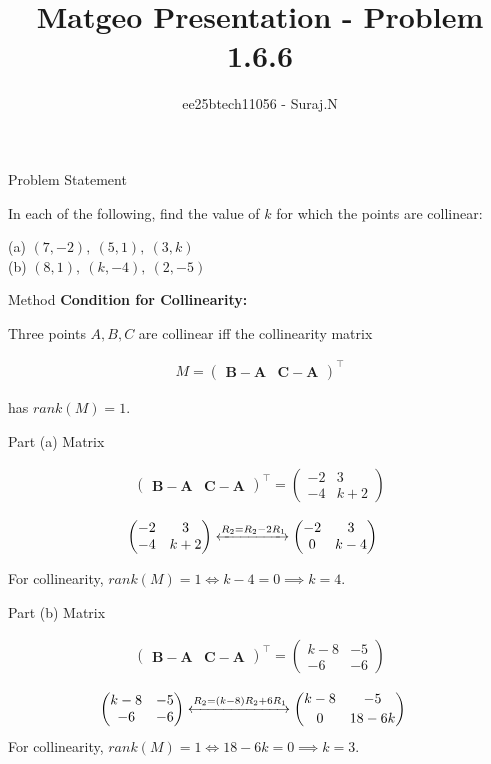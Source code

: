 \documentclass{beamer}
\title{Matgeo Presentation - Problem 1.6.6}
\author{ee25btech11056 - Suraj.N}
\numberwithin{equation}{section}
\providecommand{\brak}[1]{\ensuremath{\left(#1\right)}}
\theoremstyle{remark}
\newcommand{\myvec}[1]{\ensuremath{\begin{pmatrix}#1\end{pmatrix}}}
\let\vec\mathbf
\begin{document}
\begin{frame}
  \titlepage
\end{frame}

\begin{frame}{Problem Statement}

 In each of the following, find the value of $k$ for which the points are collinear:
  
    (a) $(7,-2),\ (5,1),\ (3,k)$ \\
    (b) $(8,1),\ (k,-4),\ (2,-5)$
  

\end{frame}

\begin{frame}{Method}
\textbf{Condition for Collinearity:}

Three points $A, B, C$ are collinear iff the collinearity matrix

\begin{align*}
M=\myvec{ \vec{B}-\vec{A} & \vec{C}-\vec{A} }^\top
\end{align*}

has $rank\brak{M}=1$.

\end{frame}

\begin{frame}{Part (a) Matrix}

\begin{align*}
\myvec{ \vec{B}-\vec{A} & \vec{C}-\vec{A} }^\top = \myvec{-2 & 3\\ -4 & k+2}
\end{align*}

\begin{align*}
\myvec{-2 & 3\\ -4 & k+2}
&\xleftrightarrow{R_2 = R_2 - 2R_1}
\myvec{-2 & 3\\ 0 & k-4}
\end{align*}

For collinearity, $rank\brak{M}=1 \iff k-4=0 \implies \boxed{k=4}$.

\end{frame}

\begin{frame}{Part (b) Matrix}

\begin{align*}
\myvec{ \vec{B}-\vec{A} & \vec{C}-\vec{A} }^\top = \myvec{k-8 & -5\\ -6 & -6}
\end{align*}

\begin{align*}
\myvec{k-8 & -5\\ -6 & -6}
&\xleftrightarrow{R_2 = (k-8)R_2 + 6R_1}
\myvec{k-8 & -5\\[2pt] 0 & 18-6k}
\end{align*}
For collinearity, $rank\brak{M}=1 \iff 18-6k=0 \implies \boxed{k=3}$.

\end{frame}
\end{document}
